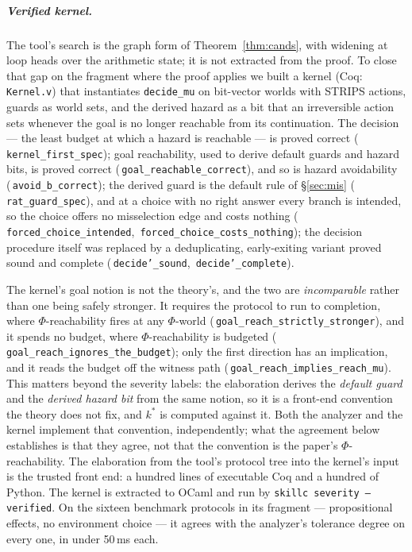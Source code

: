 \documentclass[a4paper,UKenglish,cleveref,autoref,thm-restate,anonymous]{lipics-v2021}
\newcommand{\coqok}[1]{\textcolor{okgreen}{\ding{51}}\,\texttt{\small #1}}
\newcommand{\kstar}{k^{*}}
\begin{document}
\subparagraph*{Verified kernel.} The tool's search is the graph form of
Theorem~\ref{thm:cands}, with widening at loop heads over the arithmetic
state; it is not extracted from the proof. To close that gap on the fragment
where the proof applies we built a kernel (Coq: \texttt{Kernel.v}) that
instantiates \texttt{decide\_mu} on bit-vector worlds with STRIPS actions,
guards as world sets, and the derived hazard as a bit that an irreversible
action sets whenever the goal is no longer reachable from its continuation.
The decision --- the least budget at which a hazard is reachable --- is proved
correct (\coqok{kernel\_first\_spec}); goal reachability, used to derive
default guards and hazard bits, is proved correct
(\coqok{goal\_reachable\_correct}), and so is hazard avoidability
(\coqok{avoid\_b\_correct}); the derived guard is the default rule of
\S\ref{sec:mis} (\coqok{rat\_guard\_spec}), and at a choice with no right
answer every branch is intended, so the choice offers no misselection edge
and costs nothing (\coqok{forced\_choice\_intended},
\coqok{forced\_choice\_costs\_nothing}); the decision procedure itself was
replaced by a deduplicating, early-exiting variant proved sound and complete
(\coqok{decide'\_sound}, \coqok{decide'\_complete}).

The kernel's goal notion is not the theory's, and the two are
\emph{incomparable} rather than one being safely stronger. It requires the
protocol to run to completion, where $\Phi$-reachability fires at any
$\Phi$-world (\coqok{goal\_reach\_strictly\_stronger}), and it spends no
budget, where $\Phi$-reachability is budgeted
(\coqok{goal\_reach\_ignores\_the\_budget}); only the first direction has an
implication, and it reads the budget off the witness path
(\coqok{goal\_reach\_implies\_reach\_mu}). This matters beyond the severity
labels: the elaboration derives the \emph{default guard} and the
\emph{derived hazard bit} from the same notion, so it is a front-end convention
the theory does not fix, and $\kstar$ is computed against it. Both the analyzer
and the kernel implement that convention, independently; what the agreement
below establishes is that they agree, not that the convention is the paper's
$\Phi$-reachability. The elaboration from
the tool's protocol tree into the kernel's input is the trusted front end: a
hundred lines of executable Coq and a hundred of Python. The kernel is
extracted to OCaml and run by \texttt{skillc severity --verified}. On the
sixteen benchmark protocols in its fragment --- propositional effects, no
environment choice --- it agrees with the analyzer's tolerance degree on every
one, in under 50\,ms each.
\end{document}

